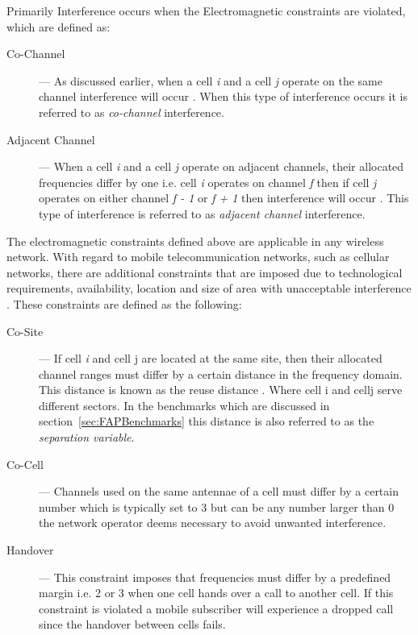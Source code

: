Primarily Interference occurs when the Electromagnetic constraints are violated, which are defined as:
\begin{description}
\item[Co-Channel] --- As discussed earlier, when a cell \emph{i} and a cell \emph{j} operate on the same channel interference will occur \cite{WirelessCommunications,WirelessDigitalCommunications,GSMSysEngin,PrinciplesMobileCommunication,Eisenblatter,EfficientEvoChannelManagement,Karen2004,ACOvsEA,InterferenceOrientatedFAP}. When this type of interference occurs it is referred to as \emph{co-channel} interference.
\item[Adjacent Channel] --- When a cell \emph{i} and a cell \emph{j} operate on adjacent channels, their allocated frequencies differ by one i.e. cell \emph{i} operates on channel \emph{f} then if cell \emph{j} operates on either channel \emph{f - 1} or \emph{f + 1} then interference will occur \cite{WirelessCommunications,WirelessDigitalCommunications,GSMSysEngin,PrinciplesMobileCommunication,Eisenblatter,EfficientEvoChannelManagement,Karen2004,ACOvsEA,InterferenceOrientatedFAP}. This type of interference is referred to as \emph{adjacent channel} interference.
\end{description}

The electromagnetic constraints defined above are applicable in any wireless network. With regard to mobile telecommunication networks, such as cellular networks, there are additional constraints that are imposed due to technological requirements, availability, location and size of area with unacceptable interference \cite{Karen2004,Eisenblatter,AndreasPaper}. These constraints are defined as the following:
\begin{description}
\item[Co-Site] --- If cell \emph{i} and cell {j} are located at the same site, then their allocated channel ranges must differ by a certain distance in the frequency domain. This distance is known as the reuse distance \cite{FixedFAPPSO,EgyptFAPPSO,Karen2004,AndreasPaper}. Where cell {i} and cell{j} serve different sectors. In the benchmarks which are discussed in section~\ref{sec:FAPBenchmarks} this distance is also referred to as the \emph{separation variable}. 
\item[Co-Cell] --- Channels used on the same antennae of a cell must differ by a certain number which is typically set to 3 but can be any number larger than 0 the network operator deems necessary to avoid unwanted interference\cite{Karen2004,Eisenblatter,AndreasPaper}.
\item[Handover] --- This constraint imposes that frequencies must differ by a predefined margin i.e. 2 or 3 when one cell hands over a call to another cell. If this constraint is violated a mobile subscriber will experience a dropped call since the handover between cells fails\cite{Karen2004,Eisenblatter,AndreasPaper}.
\end{description}

